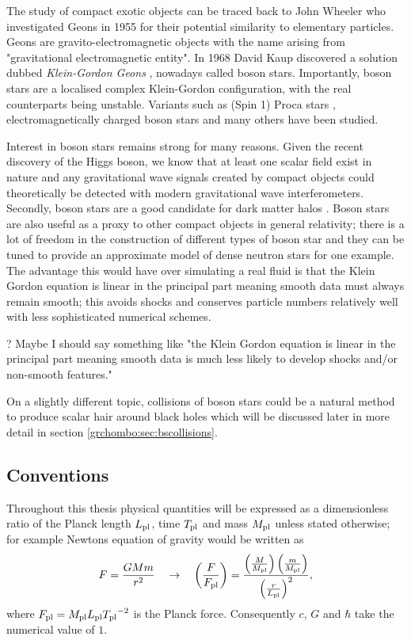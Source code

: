 The study of compact exotic objects can be traced back to John Wheeler who investigated Geons in 1955 for their potential similarity to elementary particles. Geons are gravito-electromagnetic objects with the name arising from "gravitational electromagnetic entity". In 1968 David Kaup discovered a solution dubbed {\it Klein-Gordon Geons} \cite{Kaup:1968zz}, nowadays called boson stars. Importantly, boson stars are a localised complex Klein-Gordon configuration, with the real counterparts being unstable. Variants such as (Spin 1) Proca stars \cite{brito2016proca}, electromagnetically charged boson stars and many others have been studied. 

Interest in boson stars remains strong for many reasons. Given the recent discovery of the Higgs boson, we know that at least one scalar field exist in nature and any gravitational wave signals created by compact objects could theoretically be detected with modern gravitational wave interferometers. Secondly, boson stars are a good candidate for dark matter halos \cite{lee1996galactic} \cite{schunck2003general}. Boson stars are also useful as a proxy to other compact objects in general relativity; there is a lot of freedom in the construction of different types of boson star and they can be tuned to provide an approximate model of dense neutron stars for one example. The advantage this would have over simulating a real fluid is that the Klein Gordon equation is linear in the principal part meaning smooth data must always remain smooth; this avoids shocks and conserves particle numbers relatively well with less sophisticated numerical schemes. 

\color{choral} ? Maybe I should say something like \color{orchid} "the Klein Gordon equation is linear in the principal part meaning smooth data is much less likely to develop shocks and/or non-smooth features." \color{black}

On a slightly different topic, collisions of boson stars could be a natural method to produce scalar hair around black holes which will be discussed later in more detail in section \ref{grchombo:sec:bscollisions}.

\subsection{Conventions} \label{intro:sec:conventions}
Throughout this thesis physical quantities will be expressed as a dimensionless ratio of the Planck length ${L_{\rm pl}}$, time ${T_{\rm pl}}$ and mass ${M_{\rm pl}}$ unless stated otherwise; for example Newtons equation of gravity would be written as
\begin{equation}
F=\frac{GMm}{r^2} \quad \rightarrow \quad\left(\frac{F}{{F_{\rm pl}}}\right) = \frac{\left(\frac{M}{{M_{\rm pl}}}\right)  \left(\frac{m}{{M_{\rm pl}}}\right)}{\left(\frac{r}{{L_{\rm pl}}}\right)^2},
\end{equation}
where ${F_{\rm pl}} = {M_{\rm pl}}{L_{\rm pl}}{T_{\rm pl}}^{-2}$ is the Planck force. Consequently $c$, $G$ and $\hbar$ take the numerical value of $1$.


